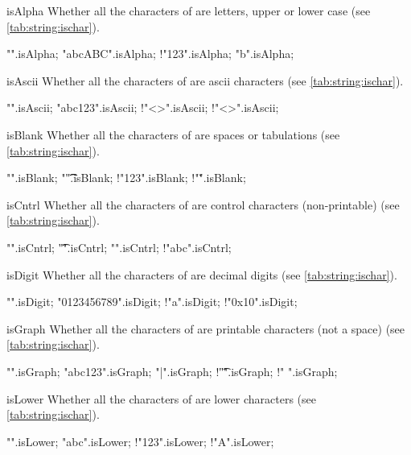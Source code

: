 \begin{urbiscriptapi}
\item[isAlpha] Whether all the characters of \this are letters, upper or
  lower case (see \autoref{tab:string:ischar}).
\begin{urbiassert}
           "".isAlpha;
     "abcABC".isAlpha;
       !"123".isAlpha;  "b".isAlpha;
\end{urbiassert}

\item[isAscii] Whether all the characters of \this are ascii characters
  (see \autoref{tab:string:ischar}).
\begin{urbiassert}[escapeinside=<>]
           "".isAscii;
     "abc123".isAscii;
         !"<>".isAscii; !"<>".isAscii;
\end{urbiassert}

\item[isBlank] Whether all the characters of \this are spaces or tabulations
  (see \autoref{tab:string:ischar}).
\begin{urbiassert}
           "".isBlank;
     "\t \t ".isBlank;
       !"123".isBlank;  !"\v".isBlank;
\end{urbiassert}


\item[isCntrl] Whether all the characters of \this are control characters
  (non-printable) (see \autoref{tab:string:ischar}).
\begin{urbiassert}
           "".isCntrl;
     "\t\n\f".isCntrl;
        "".isCntrl; !"abc".isCntrl;
\end{urbiassert}


\item[isDigit] Whether all the characters of \this are decimal digits (see
  \autoref{tab:string:ischar}).
\begin{urbiassert}
           "".isDigit;
 "0123456789".isDigit;
         !"a".isDigit;  !"0x10".isDigit;
\end{urbiassert}


\item[isGraph] Whether all the characters of \this are printable characters
  (not a space) (see \autoref{tab:string:ischar}).
\begin{urbiassert}
          "".isGraph;
    "abc123".isGraph;
       "{|}".isGraph;
   !"\t\n\r".isGraph; !" ".isGraph;
\end{urbiassert}


\item[isLower] Whether all the characters of \this are lower characters (see
  \autoref{tab:string:ischar}).
\begin{urbiassert}
          "".isLower;
       "abc".isLower;
      !"123".isLower;  !"A".isLower;
\end{urbiassert}



\end{urbiscriptapi}
